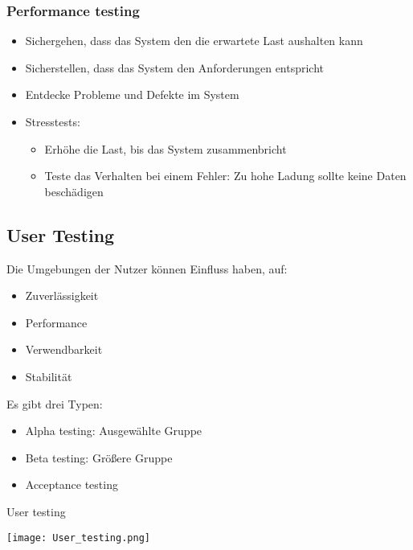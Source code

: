 \subsubsection{Performance testing}
\begin{itemize}
	\item Sichergehen, dass das System den die erwartete Last aushalten kann
	\item Sicherstellen, dass das System den Anforderungen entspricht
	\item Entdecke Probleme und Defekte im System
	\item Stresstests:
		\begin{itemize}
			\item Erhöhe die Last, bis das System zusammenbricht
			\item Teste das Verhalten bei einem Fehler: Zu hohe Ladung sollte keine Daten beschädigen
		\end{itemize}
\end{itemize}
\subsection{User Testing}
Die Umgebungen der Nutzer können Einfluss haben, auf:
\begin{itemize}
	\item Zuverlässigkeit
	\item Performance 
	\item Verwendbarkeit
	\item Stabilität
\end{itemize}
Es gibt drei Typen:
\begin{itemize}
	\item Alpha testing: Ausgewählte Gruppe
	\item Beta testing: Größere Gruppe
	\item Acceptance testing
\end{itemize}
\begin{table}[H]
\caption{User testing}	
\texttt{[image: User\_testing.png]}
\end{table}


